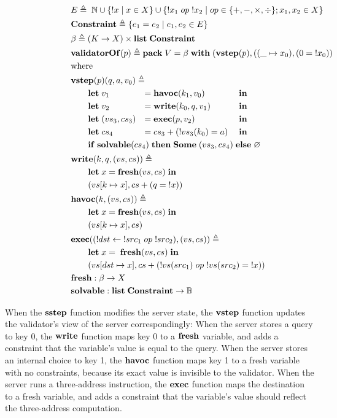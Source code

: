 \documentclass{article}
\theoremstyle{definition}
\newcommand{\Nat}{\mathbb N}
\newcommand{\Let}{\ottkw{let}\;}
\newcommand{\In}{\;\ottkw{in}}
\newcommand{\letin}[2]{\Let#1=#2\In}
\newcommand{\existT}[3]{\ottkw{pack}\;#1=#2\;\ottkw{with}\;#3}
\newcommand{\sstep}{\ottkw{sstep}}
\newcommand{\vstep}{\ottkw{vstep}}
\newcommand{\Some}[1]{\ottkw{Some}\;#1}
\newcommand{\None}{\varnothing}
\newcommand{\List}{\ottkw{list}\;}
\newcommand{\validatorOf}{\ottkw{validatorOf}}
\newcommand{\Constraint}{\ottkw{Constraint}}
\newcommand{\fresh}{\ottkw{fresh}}
\newcommand{\solvable}{\ottkw{solvable}}
\newcommand{\Write}{\ottkw{write}}
\newcommand{\Havoc}{\ottkw{havoc}}
\newcommand{\Exec}{\ottkw{exec}}
\newcommand{\If}{\ottkw{if}\;}
\newcommand{\Then}{\ottkw{then}\;}
\newcommand{\Else}{\ottkw{else}\;}
\newcommand{\bool}{\mathbb B}
\begin{document}
\begin{align*}
  \rlap{$E\triangleq\; \Nat \cup \{!x\mid x\in X\} \cup \{!x_1\;op\;!x_2\mid
    op\in\{+,-,\times,\div\}; x_1,x_2\in X\}$}\\
  \rlap{$\Constraint\triangleq\{e_1=e_2\mid e_1,e_2\in E\}$}\\
  \rlap{$\beta\triangleq(K\to X)\times\List\Constraint$}\\
  \rlap{$\validatorOf(p)\triangleq\existT{V}{\beta}{(\vstep(p), ((\_\mapsto x_0),(0=\;!x_0)))}$}\\
  \rlap{where}\\
  \rlap{$\vstep(p)(q,a,v_0)\triangleq\;$}\\
  &\qquad\letin{v_1&}{\;&\Havoc(k_1,v_0)&}\\
  &\qquad\letin{v_2&}{\;&\Write(k_0,q,v_1)&}\\
  &\qquad\letin{(vs_3,cs_3)&}{\;&\Exec(p,v_2)&}\\
  &\qquad\letin{cs_4&}{\;&cs_3+(!vs_3(k_0)=a)&}\\
  \rlap{$\qquad\If \solvable(cs_4)\;\Then \Some{(vs_3,cs_4)}\;\Else \None$}\\
  \rlap{$\Write(k,q,(vs,cs))\triangleq$}\\
  \rlap{$\qquad\letin{x}{\fresh(vs,cs)}$}\\
  \rlap{$\qquad(vs[k\mapsto x],cs+(q=\;!x))$}\\
  \rlap{$\Havoc(k,(vs,cs))\triangleq$}\\
  \rlap{$\qquad\letin{x}{\fresh(vs,cs)}$}\\
  \rlap{$\qquad(vs[k\mapsto x],cs)$}\\
  \rlap{$\Exec((!dst\gets\;!src_1\;op\;!src_2),(vs,cs))\triangleq$}\\
  \rlap{$\qquad\letin{x}{\;\fresh(vs,cs)}$}\\
  \rlap{$\qquad(vs[dst\mapsto x],cs+(!vs(src_1)\;op\;!vs(src_2)=\;!x))$}\\
  \rlap{$\fresh:\beta\to X$}\\
  \rlap{$\solvable:\List\Constraint\to\bool$}
\end{align*}

When the $\sstep$ function modifies the server state, the $\vstep$ function
updates the validator's view of the server correspondingly: When the server
stores a query to key 0, the $\Write$ function maps key 0 to a $\fresh$
variable, and adds a constraint that the variable's value is equal to the query.
When the server stores an internal choice to key 1, the $\Havoc$ function maps
key 1 to a fresh variable with no constraints, because its exact value is
invisible to the validator.  When the server runs a three-address instruction,
the $\Exec$ function maps the destination to a fresh variable, and adds a
constraint that the variable's value should reflect the three-address
computation.
\end{document}
